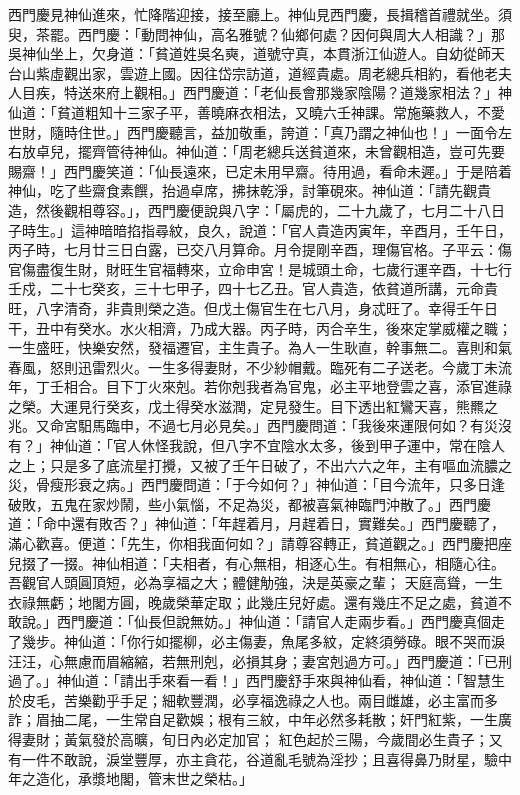 \begin{showcontents}{}
西門慶見神仙進來，忙降階迎接，接至廳上。神仙見西門慶，長揖稽首禮就坐。須臾，茶罷。西門慶：「動問神仙，高名雅號？仙鄉何處？因何與周大人相識？」那吳神仙坐上，欠身道：「貧道姓吳名奭，道號守真，本貫浙江仙遊人。自幼從師天台山紫虛觀出家，雲遊上國。因往岱宗訪道，道經貴處。周老總兵相約，看他老夫人目疾，特送來府上觀相。」西門慶道：「老仙長會那幾家陰陽？道幾家相法？」神仙道：「貧道粗知十三家子平，善曉麻衣相法，又曉六壬神課。常施藥救人，不愛世財，隨時住世。」西門慶聽言，益加敬重，誇道：「真乃謂之神仙也！」一面令左右放卓兒，擺齊管待神仙。神仙道：「周老總兵送貧道來，未曾觀相造，豈可先要賜齋！」西門慶笑道：「仙長遠來，已定未用早齋。待用過，看命未遲。」于是陪着神仙，吃了些齋食素饌，抬過卓席，拂抹乾淨，討筆硯來。神仙道：「請先觀貴造，然後觀相尊容。」，西門慶便說與八字：「屬虎的，二十九歲了，七月二十八日子時生。」這神暗暗掐指尋紋，良久，說道：「官人貴造丙寅年，辛酉月，壬午日，丙子時，七月廿三日白露，已交八月算命。月令提剛辛酉，理傷官格。子平云：傷官傷盡復生財，財旺生官福轉來，立命申宮！是城頭土命，七歲行運辛酉，十七行壬戍，二十七癸亥，三十七甲子，四十七乙丑。官人貴造，依貧道所講，元命貴旺，八字清奇，非貴則榮之造。但戊土傷官生在七八月，身忒旺了。幸得壬午日干，丑中有癸水。水火相濟，乃成大器。丙子時，丙合辛生，後來定掌威權之職；一生盛旺，快樂安然，發福遷官，主生貴子。為人一生耿直，幹事無二。喜則和氣春風，怒則迅雷烈火。一生多得妻財，不少紗帽戴。臨死有二子送老。今歲丁未流年，丁壬相合。目下丁火來剋。若你剋我者為官鬼，必主平地登雲之喜，添官進祿之榮。大運見行癸亥，戊土得癸水滋潤，定見發生。目下透出紅鸞天喜，熊羆之兆。又命宮馹馬臨申，不過七月必見矣。」西門慶問道：「我後來運限何如？有災沒有？」神仙道：「官人休怪我說，但八字不宜陰水太多，後到甲子運中，常在陰人之上；只是多了底流星打攪，又被了壬午日破了，不出六六之年，主有嘔血流膿之災，骨瘦形衰之病。」西門慶問道：「于今如何？」神仙道：「目今流年，只多日逢破敗，五鬼在家炒鬧，些小氣惱，不足為災，都被喜氣神臨門沖散了。」西門慶道：「命中還有敗否？」神仙道：「年趕着月，月趕着日，實難矣。」西門慶聽了，滿心歡喜。便道：「先生，你相我面何如？」請尊容轉正，貧道觀之。」西門慶把座兒掇了一掇。神仙相道：「夫相者，有心無相，相逐心生。有相無心，相隨心往。吾觀官人頭圓頂短，必為享福之大；體健觔強，決是英豪之輩； 天庭高聳，一生衣祿無虧；地閣方圓，晚歲榮華定取；此幾庄兒好處。還有幾庄不足之處，貧道不敢說。」西門慶道：「仙長但說無妨。」神仙道：「請官人走兩步看。」西門慶真個走了幾步。神仙道：「你行如擺柳，必主傷妻，魚尾多紋，定終須勞碌。眼不哭而淚汪汪，心無慮而眉縮縮，若無刑剋，必損其身；妻宮剋過方可。」西門慶道：「已刑過了。」神仙道：「請出手來看一看！」西門慶舒手來與神仙看，神仙道：「智慧生於皮毛，苦樂勸乎手足；細軟豐潤，必享福逸祿之人也。兩目雌雄，必主富而多詐；眉抽二尾，一生常自足歡娛；根有三紋，中年必然多耗散；奸門紅紫，一生廣得妻財；黃氣發於高曠，旬日內必定加官； 紅色起於三陽，今歲間必生貴子；又有一件不敢說，淚堂豐厚，亦主貪花，谷道亂毛號為淫抄；且喜得鼻乃財星，驗中年之造化，承漿地閣，管末世之榮枯。」


\end{showcontents}
